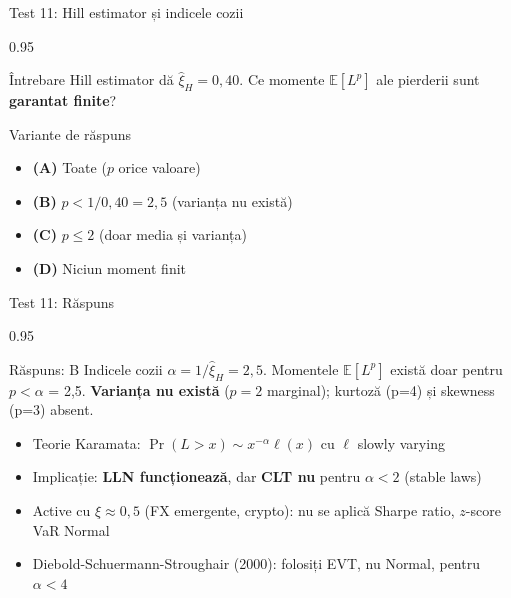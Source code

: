 \documentclass[9pt, aspectratio=169, t]{beamer}
\begin{document}
\begin{frame}[shrink=10]{Test 11: Hill estimator și indicele cozii}
    \begin{cminipage}{0.95\textwidth}
    \begin{alertblock}{Întrebare}
    Hill estimator dă $\hat{\xi}_H = 0{,}40$. Ce momente $\mathbb{E}[L^p]$ ale pierderii sunt \textbf{garantat finite}?
    \end{alertblock}
    \begin{block}{Variante de răspuns}
    \begin{itemize}\setlength{\itemsep}{0pt}
        \item \textbf{(A)} Toate ($p$ orice valoare)
        \item \textbf{(B)} $p < 1/0{,}40 = 2{,}5$ (varianța nu există)
        \item \textbf{(C)} $p \leq 2$ (doar media și varianța)
        \item \textbf{(D)} Niciun moment finit
    \end{itemize}
    \end{block}
    \end{cminipage}
\end{frame}

\begin{frame}[shrink=10]{Test 11: Răspuns}
    \begin{cminipage}{0.95\textwidth}
    \begin{exampleblock}{Răspuns: B}
    Indicele cozii $\alpha = 1/\hat{\xi}_H = 2{,}5$. Momentele $\mathbb{E}[L^p]$ există doar pentru $p < \alpha$ = 2{,}5. \textbf{Varianța nu există} ($p=2$ marginal); kurtoză (p=4) și skewness (p=3) absent.
    \end{exampleblock}
    \begin{itemize}\setlength{\itemsep}{0pt}
        \item Teorie Karamata: $\Pr(L > x) \sim x^{-\alpha}\ell(x)$ cu $\ell$ slowly varying
        \item Implicație: \textbf{LLN funcționează}, dar \textbf{CLT nu} pentru $\alpha < 2$ (stable laws)
        \item Active cu $\xi \approx 0{,}5$ (FX emergente, crypto): nu se aplică Sharpe ratio, $z$-score VaR Normal
        \item Diebold-Schuermann-Stroughair (2000): folosiți EVT, nu Normal, pentru $\alpha < 4$
    \end{itemize}
    \end{cminipage}
\end{frame}
\end{document}
